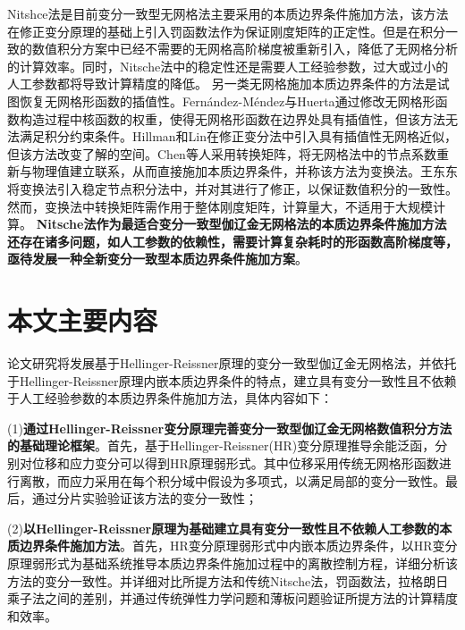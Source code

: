 Nitshce法\textsuperscript{\cite{fernandez-mendez2004}}是目前变分一致型无网格法主要采用的本质边界条件施加方法，该方法在修正变分原理的基础上引入罚函数法作为保证刚度矩阵的正定性。但是在积分一致的数值积分方案中已经不需要的无网格高阶梯度被重新引入，降低了无网格分析的计算效率。同时，Nitsche法中的稳定性还是需要人工经验参数，过大或过小的人工参数都将导致计算精度的降低。
另一类无网格施加本质边界条件的方法是试图恢复无网格形函数的插值性。Fernández-Méndez与Huerta\textsuperscript{\cite{fernandez-mendez2004}}通过修改无网格形函数构造过程中核函数的权重，使得无网格形函数在边界处具有插值性，但该方法无法满足积分约束条件。Hillman和Lin\textsuperscript{\cite{hillman2021}}在修正变分法中引入具有插值性无网格近似，但该方法改变了解的空间。Chen等人\textsuperscript{\cite{chen1996}}采用转换矩阵，将无网格法中的节点系数重新与物理值建立联系，从而直接施加本质边界条件，并称该方法为变换法。王东东\textsuperscript{\cite{wang2015}}将变换法引入稳定节点积分法中，并对其进行了修正，以保证数值积分的一致性。然而，变换法中转换矩阵需作用于整体刚度矩阵，计算量大，不适用于大规模计算。
\textbf{Nitsche法作为最适合变分一致型伽辽金无网格法的本质边界条件施加方法还存在诸多问题，如人工参数的依赖性，需要计算复杂耗时的形函数高阶梯度等，亟待发展一种全新变分一致型本质边界条件施加方案}。
\section{本文主要内容}
论文研究将发展基于Hellinger-Reissner原理的变分一致型伽辽金无网格法，并依托于Hellinger-Reissner原理内嵌本质边界条件的特点，建立具有变分一致性且不依赖于人工经验参数的本质边界条件施加方法，具体内容如下：\par
(1)\textbf{通过Hellinger-Reissner变分原理完善变分一致型伽辽金无网格数值积分方法的基础理论框架}。首先，基于Hellinger-Reissner(HR)变分原理推导余能泛函，分别对位移和应力变分可以得到HR原理弱形式。其中位移采用传统无网格形函数进行离散，而应力采用在每个积分域中假设为多项式，以满足局部的变分一致性。最后，通过分片实验验证该方法的变分一致性；\par
(2)\textbf{以Hellinger-Reissner原理为基础建立具有变分一致性且不依赖人工参数的本质边界条件施加方法}。首先，HR变分原理弱形式中内嵌本质边界条件，以HR变分原理弱形式为基础系统推导本质边界条件施加过程中的离散控制方程，详细分析该方法的变分一致性。并详细对比所提方法和传统Nitsche法，罚函数法，拉格朗日乘子法之间的差别，并通过传统弹性力学问题和薄板问题验证所提方法的计算精度和效率。



